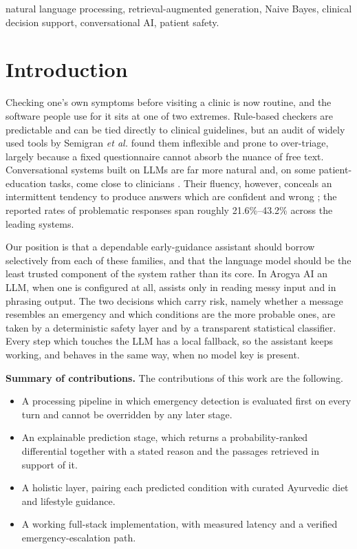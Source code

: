 \documentclass[conference]{IEEEtran}
\begin{document}
\begin{IEEEkeywords}
natural language processing, retrieval-augmented generation, Naive Bayes,
clinical decision support, conversational AI, patient safety.
\end{IEEEkeywords}

\section{Introduction}

Checking one's own symptoms before visiting a clinic is now routine, and the
software people use for it sits at one of two extremes. Rule-based checkers
are predictable and can be tied directly to clinical guidelines, but an audit
of widely used tools by Semigran \textit{et al.} \cite{semigran} found them
inflexible and prone to over-triage, largely because a fixed questionnaire
cannot absorb the nuance of free text. Conversational systems built on LLMs
are far more natural and, on some patient-education tasks, come close to
clinicians \cite{ayers,singhal}. Their fluency, however, conceals an
intermittent tendency to produce answers which are confident and wrong
\cite{thiru}; the reported rates of problematic responses span roughly
21.6\%--43.2\% across the leading systems.

Our position is that a dependable early-guidance assistant should borrow
selectively from each of these families, and that the language model should
be the least trusted component of the system rather than its core. In Arogya
AI an LLM, when one is configured at all, assists only in reading messy input
and in phrasing output. The two decisions which carry risk, namely whether a
message resembles an emergency and which conditions are the more probable
ones, are taken by a deterministic safety layer and by a transparent
statistical classifier. Every step which touches the LLM has a local
fallback, so the assistant keeps working, and behaves in the same way, when
no model key is present.

\textbf{Summary of contributions.} The contributions of this work are the
following.
\begin{itemize}
\item A processing pipeline in which emergency detection is evaluated first
on every turn and cannot be overridden by any later stage.
\item An explainable prediction stage, which returns a probability-ranked
differential together with a stated reason and the passages retrieved in
support of it.
\item A holistic layer, pairing each predicted condition with curated
Ayurvedic diet and lifestyle guidance.
\item A working full-stack implementation, with measured latency and a
verified emergency-escalation path.
\end{itemize}
\end{document}
